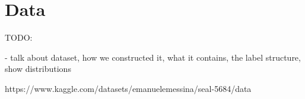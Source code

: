 \section{Data}
\label{sec:data}

TODO:

- talk about dataset, how we constructed it, what it contains, the label structure, show distributions

https://www.kaggle.com/datasets/emanuelemessina/seal-5684/data
